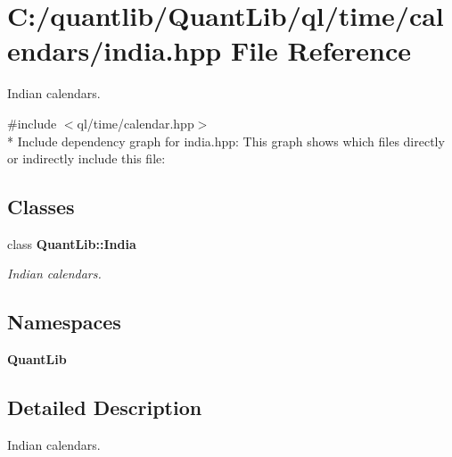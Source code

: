 \section{C\+:/quantlib/\+Quant\+Lib/ql/time/calendars/india.hpp File Reference}
\label{india_8hpp}


Indian calendars.  


{\ttfamily \#include $<$ql/time/calendar.\+hpp$>$}\\*
Include dependency graph for india.\+hpp\+:
This graph shows which files directly or indirectly include this file\+:
\subsection*{Classes}
\begin{DoxyCompactItemize}
\item 
class {\bf Quant\+Lib\+::\+India}
\begin{DoxyCompactList}\small\item\em Indian calendars. \end{DoxyCompactList}\end{DoxyCompactItemize}
\subsection*{Namespaces}
\begin{DoxyCompactItemize}
\item 
 {\bf Quant\+Lib}
\end{DoxyCompactItemize}


\subsection{Detailed Description}
Indian calendars. 

